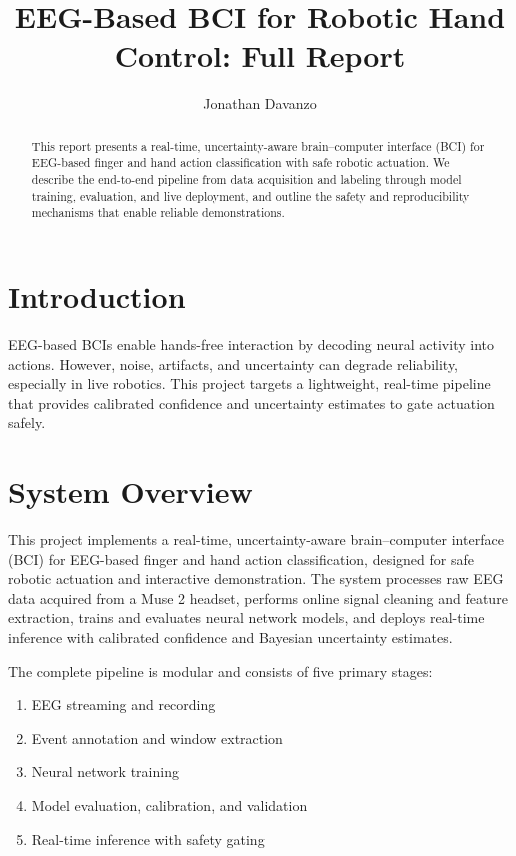 \documentclass[11pt]{article}
\title{\textbf{EEG-Based BCI for Robotic Hand Control: Full Report}}
\author{Jonathan Davanzo}
\date{}
\begin{document}
\maketitle
\tableofcontents
\newpage

\begin{abstract}
This report presents a real-time, uncertainty-aware brain--computer interface
(BCI) for EEG-based finger and hand action classification with safe robotic
actuation. We describe the end-to-end pipeline from data acquisition and
labeling through model training, evaluation, and live deployment, and outline
the safety and reproducibility mechanisms that enable reliable demonstrations.
\end{abstract}

\section{Introduction}
EEG-based BCIs enable hands-free interaction by decoding neural activity into
actions. However, noise, artifacts, and uncertainty can degrade reliability,
especially in live robotics. This project targets a lightweight, real-time
pipeline that provides calibrated confidence and uncertainty estimates to gate
actuation safely.

\section{System Overview}

This project implements a real-time, uncertainty-aware brain--computer interface (BCI) for EEG-based finger and hand action classification, designed for safe robotic actuation and interactive demonstration. The system processes raw EEG data acquired from a Muse 2 headset, performs online signal cleaning and feature extraction, trains and evaluates neural network models, and deploys real-time inference with calibrated confidence and Bayesian uncertainty estimates.

The complete pipeline is modular and consists of five primary stages:
\begin{enumerate}
    \item EEG streaming and recording
    \item Event annotation and window extraction
    \item Neural network training
    \item Model evaluation, calibration, and validation
    \item Real-time inference with safety gating
\end{enumerate}
\end{document}
